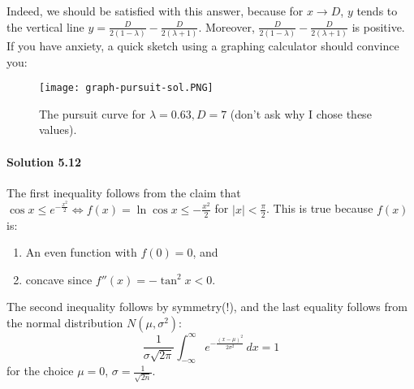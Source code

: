\documentclass[../main.tex]{subfiles}
\begin{document}
\begin{enumerate}
Indeed, we should be satisfied with this answer, because for $x \to D$, $y$ tends to the vertical line $y=\frac{D}{2(1-\lambda)}-\frac{D}{2(\lambda+1)}$. Moreover, $\frac{D}{2(1-\lambda)}-\frac{D}{2(\lambda+1)}$ is positive. If you have anxiety, a quick sketch using a graphing calculator should convince you:
\begin{figure}[H]
    \centering
    \texttt{[image: graph-pursuit-sol.PNG]}
    \caption{The pursuit curve for $\lambda=0.63, D=7$ (don't ask why I chose these values).}
    \label{fig:graph-pursuit-sol}
\end{figure}
\end{enumerate}

\paragraph{Solution 5.12}
The first inequality follows from the claim that $\cos{x} \leq e^{-\frac{x^2}{2}} \Longleftrightarrow f(x)=\ln{\cos{x}} \leq -\frac{x^2}{2}$ for $|x|<\frac{\pi}{2}$. This is true because $f(x)$ is:
\begin{enumerate}
    \item An even function with $f(0)=0$, and
    \item concave since $f''(x)=-\tan^2{x} < 0$.
\end{enumerate}
The second inequality follows by symmetry(!), and the last equality follows from the normal distribution $N(\mu, \sigma^2)$:
$$\frac{1}{\sigma\sqrt{2\pi}}\int_{-\infty}^{\infty}e^{-\frac{(x-\mu)^2}{2\sigma^2}} \,dx = 1$$ for the choice $\mu = 0$, $ \sigma=\frac{1}{\sqrt{2n}}$.
\end{document}
